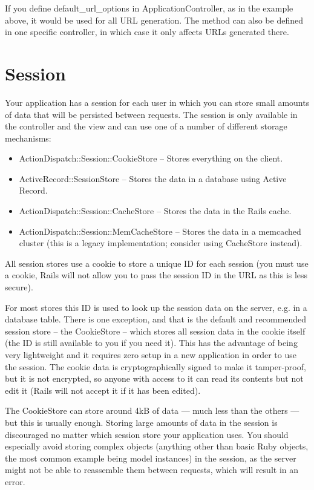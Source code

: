 \documentclass[10pt]{book}
\begin{document}
If you define default\_url\_options in ApplicationController, as in the example above, it would be used for all URL generation. The method can also be defined in one specific controller, in which case it only affects URLs generated there.

\section{ Session}

Your application has a session for each user in which you can store  small amounts of data that will be persisted between requests. The  session is only available in the controller and the view and can use one  of a number of different storage mechanisms:
\begin{itemize}
	\item ActionDispatch::Session::CookieStore – Stores everything on the client.
	\item ActiveRecord::SessionStore – Stores the data in a database using Active Record.
	\item ActionDispatch::Session::CacheStore – Stores the data in the Rails cache.
	\item ActionDispatch::Session::MemCacheStore – Stores the data in a  memcached cluster (this is a legacy implementation; consider using  CacheStore instead).
\end{itemize}

All session stores use a cookie to store a unique ID for each session  (you must use a cookie, Rails will not allow you to pass the session ID  in the URL as this is less secure).

For most stores this ID is used to look up the session data on the  server, e.g. in a database table. There is one exception, and that is  the default and recommended session store – the CookieStore – which  stores all session data in the cookie itself (the ID is still available  to you if you need it). This has the advantage of being very lightweight  and it requires zero setup in a new application in order to use the  session. The cookie data is cryptographically signed to make it  tamper-proof, but it is not encrypted, so anyone with access to it can  read its contents but not edit it (Rails will not accept it if it has  been edited).

The CookieStore can store around 4kB of data — much less than the  others — but this is usually enough. Storing large amounts of data in  the session is discouraged no matter which session store your  application uses. You should especially avoid storing complex objects  (anything other than basic Ruby objects, the most common example being  model instances) in the session, as the server might not be able to  reassemble them between requests, which will result in an error.
\end{document}
